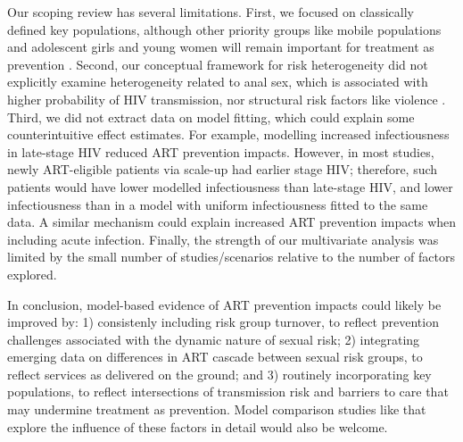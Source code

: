 \par
Our scoping review has several limitations.
First, we focused on classically defined key populations,
although other priority groups like mobile populations and adolescent girls and young women
will remain important for treatment as prevention \cite{Tanser2015,Dellar2015}.
Second, our conceptual framework for risk heterogeneity did not explicitly examine
heterogeneity related to anal sex, which is associated with higher probability of HIV transmission,
nor structural risk factors like violence \cite{Silverman2011,Baggaley2013}.
Third, we did not extract data on model fitting,
which could explain some counterintuitive effect estimates.
For example, modelling increased infectiousness in late-stage HIV reduced ART prevention impacts.
However, in most studies, newly ART-eligible patients via scale-up had earlier stage HIV;
therefore, such patients would have lower modelled infectiousness than late-stage HIV,
and lower infectiousness than in a model with uniform infectiousness fitted to the same data.
A similar mechanism could explain increased ART prevention impacts when including acute infection.
Finally, the strength of our multivariate analysis was limited by
the small number of studies/scenarios relative to the number of factors explored.
\par
In conclusion, model-based evidence of ART prevention impacts could likely be improved by:
1) consistenly including risk group turnover,
   to reflect prevention challenges associated with the dynamic nature of sexual risk;
2) integrating emerging data on differences in ART cascade between sexual risk groups,
   to reflect services as delivered on the ground; and
3) routinely incorporating key populations,
   to reflect intersections of transmission risk and barriers to care
   that may undermine treatment as prevention.
Model comparison studies like \cite{Dodd2010,Hontelez2013} that explore
the influence of these factors in detail would also be welcome.